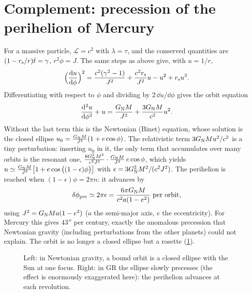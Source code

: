 \section{Complement: precession of the perihelion of Mercury}

For a massive particle, $\mathcal L=c^2$ with $\lambda=\tau$, and the conserved quantities are $(1-r_{\mathrm s}/r)\dot t=\gamma$, $r^2\dot\phi=J$. The same steps as above give, with $u=1/r$,
\[
  \Big(\frac{\mathrm{d} u}{\mathrm{d}\phi}\Big)^2=\frac{c^2(\gamma^2-1)}{J^2}+\frac{c^2r_{\mathrm s}}{J^2}u-u^2+r_{\mathrm s} u^3 .
\]
Differentiating with respect to $\phi$ and dividing by $2\,\dd u/\dd\phi$ gives the orbit equation
\begin{equation}
  \frac{\mathrm{d}^2u}{\mathrm{d}\phi^2}+u=\frac{G_{\mathrm N} M}{J^2}+\frac{3G_{\mathrm N} M}{c^2}u^2 .
\end{equation}
Without the last term this is the Newtonian (Binet) equation, whose solution is the closed ellipse $u_0=\frac{G_{\mathrm N} M}{J^2}(1+e\cos\phi)$. The relativistic term $3G_{\mathrm N} Mu^2/c^2$ is a tiny perturbation: inserting $u_0$ in it, the only term that accumulates over many orbits is the resonant one, $\frac{6G_{\mathrm N}^2M^2}{c^2J^2}\cdot\frac{G_{\mathrm N} M}{J^2}\,e\cos\phi$, which yields $u\simeq\frac{G_{\mathrm N} M}{J^2}\big[1+e\cos\big((1-\epsilon)\phi\big)\big]$ with $\epsilon=3G_{\mathrm N}^2M^2/(c^2J^2)$. The perihelion is reached when $(1-\epsilon)\phi=2\pi n$: it advances by
\begin{equation}
  \delta\phi_{\rm per}\simeq2\pi\epsilon=\frac{6\pi G_{\mathrm N} M}{c^2a(1-e^2)}\ \text{per orbit},
\end{equation}
using $J^2=G_{\mathrm N} Ma(1-e^2)$ ($a$ the semi-major axis, $e$ the eccentricity). For Mercury this gives $43''$ per century, exactly the anomalous precession that Newtonian gravity (including perturbations from the other planets) could not explain. The orbit is no longer a closed ellipse but a rosette (\cref{fig:mercury}).

\begin{figure}[ht]
\centering
{}
\hspace{1.5cm}
\caption{Left: in Newtonian gravity, a bound orbit is a closed ellipse with the Sun at one focus. Right: in GR the ellipse slowly precesses (the effect is enormously exaggerated here): the perihelion advances at each revolution.}
\label{fig:mercury}
\end{figure}

